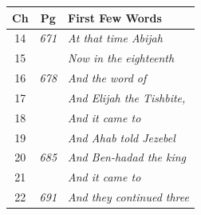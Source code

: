 \documentclass{article}
\newlength{\minipageheight}
\newlength{\minipagewidth}
\begin{document}
\begin{minipage}[r][\minipageheight][t]{\minipagewidth}%
    \begin{longtable}{ccl}
        \textbf{Ch} & \textbf{Pg}  & \textbf{First Few Words}            \\%
        \hline%
        \endfirsthead%
        14          & \textit{671} & \textit{At that time Abijah}        \\
        15          &              & \textit{Now in the eighteenth}      \\
        16          & \textit{678} & \textit{And the word of}            \\
        17          &              & \textit{And Elijah the Tishbite,}   \\
        18          &              & \textit{And it came to}             \\
        19          &              & \textit{And Ahab told Jezebel}      \\
        20          & \textit{685} & \textit{And Ben-hadad the king}     \\
        21          &              & \textit{And it came to}             \\
        22          & \textit{691} & \textit{And they continued three}   \\


\end{longtable}
\end{minipage}
\end{document}
